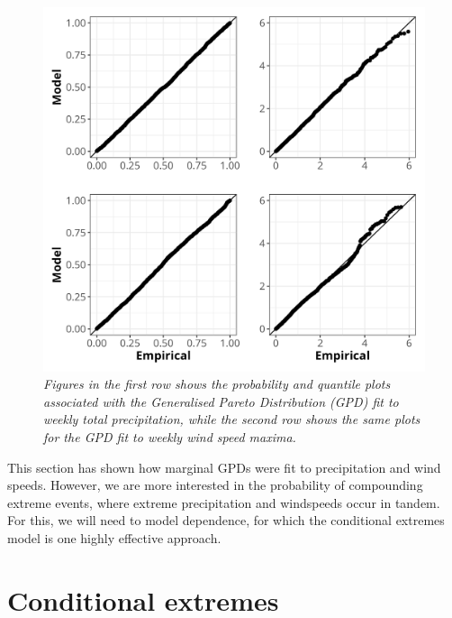\documentclass{article}
\numberwithin{equation}{section}
\begin{document}
\begin{figure}[H]
    \centering
    \includegraphics[width = 0.9\linewidth]{plots/035_pp_qq.png}
    \caption{\emph{Figures in the first row shows the probability and quantile plots associated with the Generalised Pareto Distribution (GPD) fit to weekly total precipitation, while the second row shows the same plots for the GPD fit to weekly wind speed maxima.}}
    \label{fig:03_pp_qq}
\end{figure}

This section has shown how marginal GPDs were fit to precipitation and wind speeds. 
However, we are more interested in the probability of compounding extreme events, where extreme precipitation and windspeeds occur in tandem.
For this, we will need to model dependence, for which the conditional extremes model is one highly effective approach.

\newpage
\section{Conditional extremes}\label{sec:ce}

\end{document}
